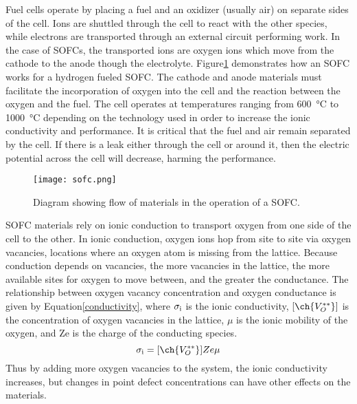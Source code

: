 Fuel cells operate by placing a fuel and an oxidizer (usually air) on separate sides of the cell.
Ions are shuttled through the cell to react with the other species, while electrons are transported through an external circuit performing work.
In the case of SOFCs, the transported ions are oxygen ions which move from the cathode to the anode though the electrolyte.
Figure\ref{image:sofc} demonstrates how an SOFC works for a hydrogen fueled SOFC\@.
The cathode and anode materials must facilitate the incorporation of oxygen into the cell and the reaction between the oxygen and the fuel.
The cell operates at temperatures ranging from \SI{600}{\celsius} to \SI{1000}{\celsius} depending on the technology used in order to increase the ionic conductivity and performance.
It is critical that the fuel and air remain separated by the cell.
If there is a leak either through the cell or around it, then the electric potential across the cell will decrease, harming the performance.

\begin{figure}[ht]
  \centering
  \texttt{[image: sofc.png]}
  \caption[Diagram showing flow of materials in the operation of a SOFC.]{Diagram showing flow of materials in the operation of a SOFC.\cite{Sakurambo}}\label{image:sofc}
\end{figure}

SOFC materials rely on ionic conduction to transport oxygen from one side of the cell to the other.
In ionic conduction, oxygen ions hop from site to site via oxygen vacancies, locations where an oxygen atom is missing from the lattice.
Because conduction depends on vacancies, the more vacancies in the lattice, the more available sites for oxygen to move between, and the greater the conductance.
The relationship between oxygen vacancy concentration and oxygen conductance is given by Equation\ref{conductivity}, where \(\sigma_{\textrm{i}}\) is the ionic conductivity, \(\lbrack\ch{V_O^{**}}\rbrack \) is the concentration of oxygen vacancies in the lattice, \(\mu \) is the ionic mobility of the oxygen, and Ze is the charge of the conducting species.\cite{Mogensen2000}
\begin{equation} \label{conductivity}
  \sigma\subscript{i} = \lbrack\ch{V_O^{**}}\rbrack Ze\mu
\end{equation}
Thus by adding more oxygen vacancies to the system, the ionic conductivity increases, but changes in point defect concentrations can have other effects on the materials.

